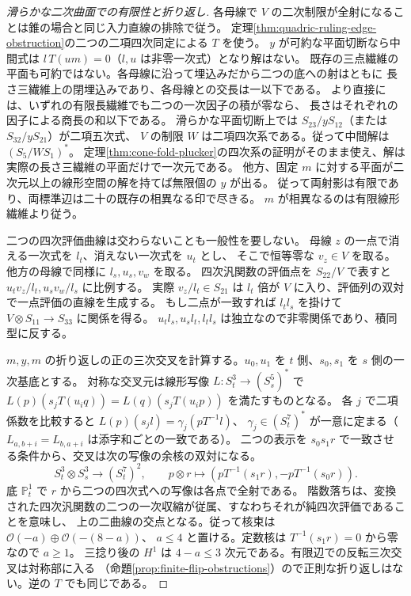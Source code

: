 \begin{proof}[滑らかな二次曲面での有限性と折り返し]
各母線で $V$ の二次制限が全射になることは錐の場合と同じ入力直線の排除で従う。
定理\ref{thm:quadric-ruling-edge-obstruction}の二つの二項四次同定による $T$ を使う。
$y$ が可約な平面切断なら中間式は $l\,T(u m)=0$（$l,u$ は非零一次式）となり解はない。
既存の三点繊維の平面も可約ではない。各母線に沿って埋込みだから二つの底への射はともに
長さ三繊維上の閉埋込みであり、各母線との交長は一以下である。
より直接には、いずれの有限長繊維でも二つの一次因子の積が零なら、
長さはそれぞれの因子による商長の和以下である。
滑らかな平面切断上では $S_{23}/yS_{12}$（または $S_{32}/yS_{21}$）が二項五次式、
$V$ の制限 $W$ は二項四次系である。従って中間解は $(S_5/WS_1)^*$。
定理\ref{thm:cone-fold-plucker}の四次系の証明がそのまま使え、解は実際の長さ三繊維の平面だけで一次元である。
他方、固定 $m$ に対する平面が二次元以上の線形空間の解を持てば無限個の $y$ が出る。
従って両射影は有限であり、両標準辺は二十の既存の相異なる印で尽きる。
$m$ が相異なるのは有限線形繊維より従う。

二つの四次評価曲線は交わらないことも一般性を要しない。
母線 $z$ の一点で消える一次式を $l_t$、消えない一次式を $u_t$ とし、
そこで恒等零な $v_z\in V$ を取る。他方の母線で同様に $l_s,u_s,v_w$ を取る。
四次汎関数の評価点を $S_{22}/V$ で表すと $u_t v_z/l_t, u_s v_w/l_s$ に比例する。
実際 $v_z/l_t\in S_{21}$ は $l_t$ 倍が $V$ に入り、評価列の双対で一点評価の直線を生成する。
もし二点が一致すれば $l_tl_s$ を掛けて $V\otimes S_{11}\to S_{33}$ に関係を得る。
$u_tl_s,u_sl_t,l_tl_s$ は独立なので非零関係であり、積同型に反する。

$m,y,m$ の折り返しの正の三次交叉を計算する。$u_0,u_1$ を $t$ 側、$s_0,s_1$ を $s$ 側の一次基底とする。
対称な交叉元は線形写像 $L:S_t^3\to(S_s^5)^*$ で
$L(p)(s_jT(u_i q))=L(q)(s_jT(u_i p))$ を満たすものとなる。
各 $j$ で二項係数を比較すると $L(p)(s_j l)=\gamma_j(p T^{-1}l)$、
$\gamma_j\in(S_t^7)^*$ が一意に定まる（$L_{a,b+i}=L_{b,a+i}$ は添字和ごとの一致である）。
二つの表示を $s_0s_1 r$ で一致させる条件から、交叉は次の写像の余核の双対になる。
\[
   S_t^3\otimes S_s^3\longrightarrow (S_t^7)^2,\qquad
   p\otimes r\longmapsto
   (p T^{-1}(s_1r),-p T^{-1}(s_0r)).
\]
底 $\mathbb P^1_t$ で $r$ から二つの四次式への写像は各点で全射である。
階数落ちは、変換された四次汎関数の二つの一次収縮が従属、すなわちそれが純四次評価であることを意味し、
上の二曲線の交点となる。従って核束は $\mathcal O(-a)\oplus\mathcal O(-(8-a))$、
$a\le4$ と置ける。定数核は $T^{-1}(s_1r)=0$ から零なので $a\ge1$。
三捻り後の $H^1$ は $4-a\le3$ 次元である。有限辺での反転三次交叉は対称部に入る
（命題\ref{prop:finite-flip-obstructions}）ので正則な折り返しはない。逆の $T$ でも同じである。
\end{proof}

